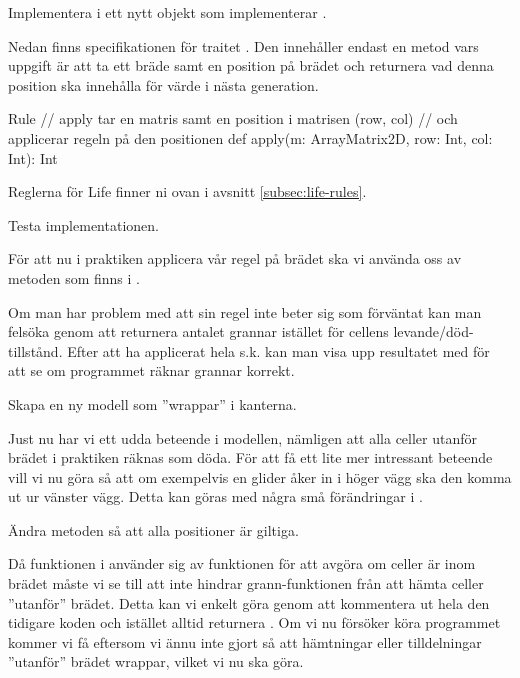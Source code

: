 \Subtask Implementera  i ett nytt objekt  som implementerar .

Nedan finns specifikationen för traitet . Den innehåller endast en metod  vars uppgift är att ta ett bräde samt en position på brädet och returnera vad denna position ska innehålla för värde i nästa generation.

\begin{ScalaSpec}{Rule}
// apply tar en matris samt en position i matrisen (row, col)
// och applicerar regeln på den positionen
def apply(m: ArrayMatrix2D, row: Int, col: Int): Int
\end{ScalaSpec}

Reglerna för Life finner ni ovan i avsnitt \ref{subsec:life-rules}.

\Subtask Testa implementationen.

För att nu i praktiken applicera vår regel på brädet ska vi använda oss av metoden  som finns i .

Om man har problem med att sin regel inte beter sig som förväntat kan man felsöka genom att returnera antalet grannar istället för cellens levande/död-tillstånd. Efter att ha applicerat hela s.k.  kan man visa upp resultatet med  för att se om programmet räknar grannar korrekt.


\Task Skapa en ny modell som ''wrappar'' i kanterna.

Just nu har vi ett udda beteende i modellen, nämligen att alla celler utanför brädet i praktiken räknas som döda. För att få ett lite mer intressant beteende vill vi nu göra så att om exempelvis en glider åker in i höger vägg ska den komma ut ur vänster vägg. Detta kan göras med några små förändringar i .

\Subtask Ändra metoden  så att alla positioner är giltiga.

Då funktionen  i  använder sig av funktionen  för att avgöra om celler är inom brädet måste vi se till att  inte hindrar grann-funktionen från att hämta celler ''utanför'' brädet. Detta kan vi enkelt göra genom att kommentera ut hela den tidigare koden och istället alltid returnera . Om vi nu försöker köra programmet kommer vi få  eftersom vi ännu inte gjort så att hämtningar eller tilldelningar ''utanför'' brädet wrappar, vilket vi nu ska göra.

